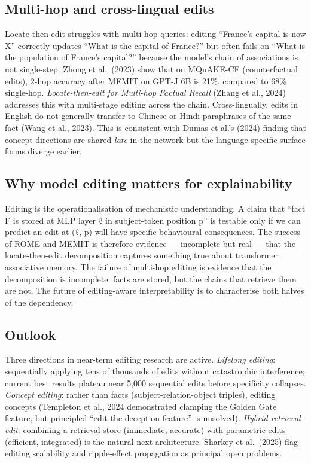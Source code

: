\subsection{Multi-hop and cross-lingual edits}\label{multi-hop-and-cross-lingual-edits}

Locate-then-edit struggles with multi-hop queries: editing ``France's capital is now X'' correctly updates ``What is the capital of France?'' but often fails on ``What is the population of France's capital?'' because the model's chain of associations is not single-step. Zhong et al.~(2023) show that on MQuAKE-CF (counterfactual edits), 2-hop accuracy after MEMIT on GPT-J 6B is 21\%, compared to 68\% single-hop. \emph{Locate-then-edit for Multi-hop Factual Recall} (Zhang et al., 2024) addresses this with multi-stage editing across the chain. Cross-lingually, edits in English do not generally transfer to Chinese or Hindi paraphrases of the same fact (Wang et al., 2023). This is consistent with Dumas et al.'s (2024) finding that concept directions are shared \emph{late} in the network but the language-specific surface forms diverge earlier.

\subsection{Why model editing matters for explainability}\label{why-model-editing-matters-for-explainability}

Editing is the operationalisation of mechanistic understanding. A claim that ``fact F is stored at MLP layer ℓ in subject-token position p'' is testable only if we can predict an edit at (ℓ, p) will have specific behavioural consequences. The success of ROME and MEMIT is therefore evidence --- incomplete but real --- that the locate-then-edit decomposition captures something true about transformer associative memory. The failure of multi-hop editing is evidence that the decomposition is incomplete: facts are stored, but the chains that retrieve them are not. The future of editing-aware interpretability is to characterise both halves of the dependency.

\subsection{Outlook}\label{outlook-1}

Three directions in near-term editing research are active. \emph{Lifelong editing}: sequentially applying tens of thousands of edits without catastrophic interference; current best results plateau near 5,000 sequential edits before specificity collapses. \emph{Concept editing}: rather than facts (subject-relation-object triples), editing concepts (Templeton et al., 2024 demonstrated clamping the Golden Gate feature, but principled ``edit the deception feature'' is unsolved). \emph{Hybrid retrieval-edit}: combining a retrieval store (immediate, accurate) with parametric edits (efficient, integrated) is the natural next architecture. Sharkey et al.~(2025) flag editing scalability and ripple-effect propagation as principal open problems.

